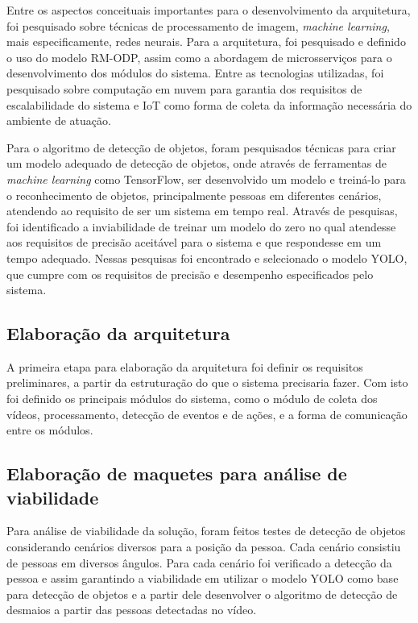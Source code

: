 \documentclass[]{politex}
\begin{document}
Entre os aspectos conceituais importantes para o desenvolvimento da arquitetura, foi pesquisado sobre técnicas de processamento de imagem, \textit{machine learning}, mais especificamente, redes neurais. Para a arquitetura, foi pesquisado e definido o uso do modelo RM-ODP, assim como a abordagem de microsserviços para o desenvolvimento dos módulos do sistema. Entre as tecnologias utilizadas, foi pesquisado sobre computação em nuvem para garantia dos requisitos de escalabilidade do sistema e IoT como forma de coleta da informação necessária do ambiente de atuação. 

Para o algoritmo de detecção de objetos, foram pesquisados técnicas para criar um modelo adequado de detecção de objetos, onde através de ferramentas de \textit{machine learning} como TensorFlow, ser desenvolvido um modelo e treiná-lo para o reconhecimento de objetos, principalmente pessoas em diferentes cenários, atendendo ao requisito de ser um sistema em tempo real. Através de pesquisas, foi identificado a inviabilidade de treinar um modelo do zero no qual atendesse aos requisitos de precisão aceitável para o sistema e que respondesse em um tempo adequado. Nessas pesquisas foi encontrado e selecionado o modelo YOLO, que cumpre com os requisitos de precisão e desempenho especificados pelo sistema.

\subsection{Elaboração da arquitetura}
A primeira etapa para elaboração da arquitetura foi definir os requisitos preliminares, a partir da estruturação do que o sistema precisaria fazer. Com isto foi definido os principais módulos do sistema, como o módulo de coleta dos vídeos, processamento, detecção de eventos e de ações, e a forma de comunicação entre os módulos.



\subsection{Elaboração de maquetes para análise de viabilidade}
Para análise de viabilidade da solução, foram feitos testes de detecção de objetos considerando cenários diversos para a posição da pessoa. Cada cenário consistiu de pessoas em diversos ângulos. Para cada cenário foi verificado a detecção da pessoa e assim garantindo a viabilidade em utilizar o modelo YOLO como base para detecção de objetos e a partir dele desenvolver o algoritmo de detecção de desmaios a partir das pessoas detectadas no vídeo.
\end{document}
